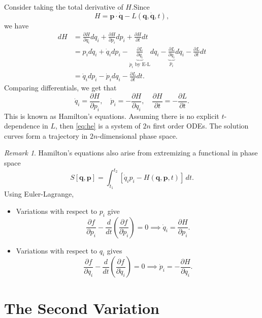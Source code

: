 \documentclass[12pt]{article}
\theoremstyle{definition}
\theoremstyle{remark}
\newtheorem*{remark}{Remark}
\begin{document}
Consider taking the total derivative of $H$.Since
\[
	H = \mathbf{p} \cdot \mathbf{\dot q} - L(\mathbf{q}, \mathbf{\dot q}, t)
,\]
we have
\begin{align*}
	dH &= \frac{\partial H}{\partial q_i}dq_i + \frac{\partial H}{\partial p_i}d p_i + \frac{\partial H}{\partial t}dt \\
	   &= p_i d\dot q_i + \dot q_i dp_i - \underbrace{\frac{\partial L}{\partial q_i}}_{\dot p_i \text{ by E-L}}dq_i - \underbrace{\frac{\partial L}{\partial \dot q_i}}_{p_i} d\dot q_i - \frac{\partial L}{\partial t}dt \\
	   &= \dot q_i dp_i - \dot p_i dq_i - \frac{\partial L}{\partial t}dt.
\end{align*}
Comparing differentials, we get that
\[
	\dot q_i = \frac{\partial H}{\partial p_i}, \quad \dot p_i = - \frac{\partial H}{\partial q_i}, \quad \frac{\partial H}{\partial t} = - \frac{\partial L}{\partial t} \tag{7.1}\label{eq:he}
.\]
This is known as Hamilton's equations. Assuming there is no explicit $t$-dependence in $L$, then \eqref{eq:he} is a system of $2n$ first order ODEs. The solution curves form a trajectory in $2n$-dimensional phase space.

\begin{remark}
	Hamilton's equations also arise from extremizing a functional in phase space
	\[
		S[\mathbf{q}, \mathbf{p}] = \int_{t_1}^{t_2} \left[ \dot q_ip_i - H(\mathbf{q}, \mathbf{p}, t) \right]\, dt
	.\]
	Using Euler-Lagrange,
	\begin{itemize}
		\item Variations with respect to $p_i$ give
			\[
				\frac{\partial f}{\partial p_i} - \frac{d}{dt} \left( \frac{\partial f}{\partial \dot p_i}\right) = 0 \implies \dot q_i = \frac{\partial H}{\partial p_i}
			.\]
		\item Variations with respect to $q_i$ gives
			\[
				\frac{\partial f}{\partial q_i} - \frac{d}{dt} \left( \frac{\partial f}{\partial \dot q_i}\right) = 0 \implies \dot p_i = - \frac{\partial H}{\partial q_i}
			.\]
	\end{itemize}
	
\end{remark}

\newpage

\section{The Second Variation}%
\label{sec:the_second_variation}
\end{document}
